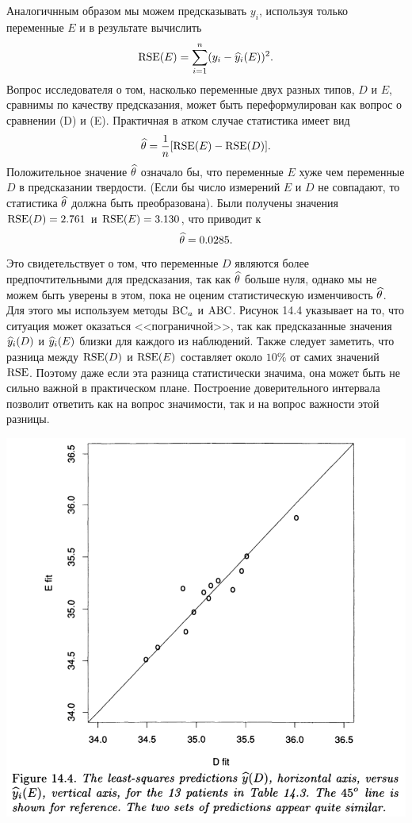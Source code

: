 Аналогичнным образом мы можем предсказывать $y_i$, используя только переменные $E$ и в результате вычислить
\begin{equation}
  \text{RSE}(E) = \sum_{i = 1}^{n}(y_i - \widehat{y}_i(E))^2.
\end{equation}
Вопрос исследователя о том, насколько переменные двух разных типов, $D$ и $E$, сравнимы по качеству предсказания, может быть переформулирован как вопрос о сравнении (D) и (E). Практичная в атком случае статистика имеет вид
\begin{equation}
  \widehat{\theta} = \frac{1}{n} [\text{RSE}(E) - \text{RSE}(D)].
\end{equation}
Положительное значение $\widehat{\theta}$ означало бы, что переменные $E$ хуже чем переменные $D$ в предсказании твердости. (Если бы число измерений $E$ и $D$ не совпадают, то статистика $\widehat{\theta}$ должна быть преобразована). %
Были получены значения $\text{RSE}(D) = 2.761$ и $\text{RSE}(E) = 3.130$, что приводит к
\begin{equation}
  \widehat{\theta} = 0.0285.
\end{equation}
Это свидетельствует о том, что переменные $D$ являются более предпочтительными для предсказания, так как $\widehat{\theta}$ больше нуля, однако мы не можем быть уверены в этом, пока не оценим статистическую изменчивость $\widehat{\theta}$. Для этого мы используем методы $\mathrm{BC}_a$ и $\mathrm{ABC}$. Рисунок 14.4 указывает на то, что ситуация может оказаться <<пограничной>>, так как предсказанные значения $\widehat{y}_i(D)$ и $\widehat{y}_i(E)$ близки для каждого из наблюдений. Также следует заметить, что разница между $\text{RSE}(D)$ и $\text{RSE}(E)$ составляет около $10\%$ от самих значений $\text{RSE}$. Поэтому даже если эта разница статистически значима, она может быть не сильно важной в практическом плане. Построение доверительного интервала позволит ответить как на вопрос значимости, так и на вопрос важности этой разницы.
 

\includegraphics[width=0.85\linewidth]{14/f144.png}
\newline

